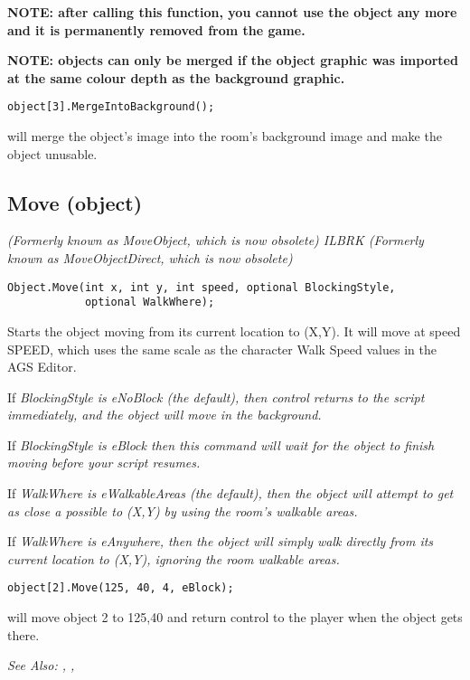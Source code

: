 \bf{NOTE:} after calling this function, you cannot use the object any more and
it is permanently removed from the game.

\bf{NOTE:} objects can only be merged if the object graphic was imported at
the same colour depth as the background graphic.

\begin{verbatim}
object[3].MergeIntoBackground();
\end{verbatim}
will merge the object's image into the room's background image and make the object unusable.


\subsection{Move (object)}\label{Object.Move}%

\it{(Formerly known as MoveObject, which is now obsolete)} ILBRK
\it{(Formerly known as MoveObjectDirect, which is now obsolete)}

\begin{verbatim}
Object.Move(int x, int y, int speed, optional BlockingStyle,
            optional WalkWhere);
\end{verbatim}
Starts the object moving from its current location to (X,Y). It will
move at speed SPEED, which uses the same scale as the character Walk Speed
values in the AGS Editor.

If \it{BlockingStyle} is eNoBlock (the default), then control returns to the script
immediately, and the object will move in the background.

If \it{BlockingStyle} is eBlock then this command will wait for the object
to finish moving before your script resumes.

If \it{WalkWhere} is eWalkableAreas (the default), then the object will attempt to
get as close a possible to (X,Y) by using the room's walkable areas.

If \it{WalkWhere} is eAnywhere, then the object will simply walk directly from its
current location to (X,Y), ignoring the room walkable areas.

\begin{verbatim}
object[2].Move(125, 40, 4, eBlock);
\end{verbatim}
will move object 2 to 125,40 and return control to the player when the object gets there.

\it{See Also:} , ,



